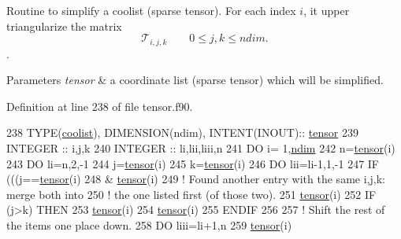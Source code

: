 Routine to simplify a coolist (sparse tensor). For each index $i$, it upper triangularize the matrix \[\mathcal{T}_{i,j,k} \qquad 0 \leq j,k \leq ndim.\]. 


\begin{DoxyParams}{Parameters}
{\em tensor} & a coordinate list (sparse tensor) which will be simplified. \\
\hline
\end{DoxyParams}


Definition at line 238 of file tensor.\+f90.


\begin{DoxyCode}
238    \textcolor{keywordtype}{TYPE}(\hyperlink{structtensor_1_1coolist}{coolist}), \textcolor{keywordtype}{DIMENSION(ndim)}, \textcolor{keywordtype}{INTENT(INOUT)}:: \hyperlink{namespacetensor}{tensor}
239    \textcolor{keywordtype}{INTEGER} :: i,j,k
240    \textcolor{keywordtype}{INTEGER} :: li,lii,liii,n
241    \textcolor{keywordflow}{DO} i= 1,\hyperlink{namespaceparams_a2323fe1773f086e20c14f266351c482b}{ndim}
242       n=\hyperlink{namespacetensor}{tensor}(i)%
243       \textcolor{keywordflow}{DO} li=n,2,-1
244          j=\hyperlink{namespacetensor}{tensor}(i)%
245          k=\hyperlink{namespacetensor}{tensor}(i)%
246          \textcolor{keywordflow}{DO} lii=li-1,1,-1
247             \textcolor{keywordflow}{IF} (((j==\hyperlink{namespacetensor}{tensor}(i)%
248                  &%
      \hyperlink{namespacetensor}{tensor}(i)%
249                \textcolor{comment}{! Found another entry with the same i,j,k: merge both into}
250                \textcolor{comment}{! the one listed first (of those two). }
251                \hyperlink{namespacetensor}{tensor}(i)%
252                \textcolor{keywordflow}{IF} (j>k) \textcolor{keywordflow}{THEN}
253                   \hyperlink{namespacetensor}{tensor}(i)%
254                   \hyperlink{namespacetensor}{tensor}(i)%
255 \textcolor{keywordflow}{               ENDIF}
256                
257                \textcolor{comment}{! Shift the rest of the items one place down.}
258                \textcolor{keywordflow}{DO} liii=li+1,n
259                   \hyperlink{namespacetensor}{tensor}(i)%

\end{DoxyCode}
